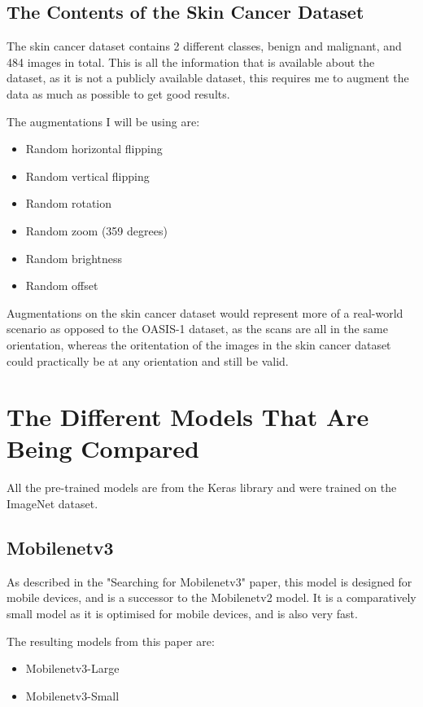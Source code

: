 \documentclass[]{final_report}
\begin{document}
\section{The Contents of the Skin Cancer Dataset}

The skin cancer dataset contains 2 different classes, benign and malignant, and 484 images in total.
This is all the information that is available about the dataset, as it is not a publicly available dataset, this requires me to augment the data as much as possible to get good results.

The augmentations I will be using are:
\begin{itemize}
  \item Random horizontal flipping
  \item Random vertical flipping
  \item Random rotation
  \item Random zoom (359 degrees)
  \item Random brightness
  \item Random offset
\end{itemize}

Augmentations on the skin cancer dataset would represent more of a real-world scenario as opposed to the OASIS-1 dataset, as the scans are all in the same orientation, whereas the oritentation of the images in the skin cancer dataset could practically be at any orientation and still be valid.

\chapter{The Different Models That Are Being Compared}

All the pre-trained models are from the Keras library\cite{Keras} and were trained on the ImageNet dataset\cite{ImageNet}.

\section{Mobilenetv3}

As described in the "Searching for Mobilenetv3" paper\cite{DBLP:journals/corr/abs-1905-02244}, this model is designed for mobile devices, and is a successor to the Mobilenetv2 model.
It is a comparatively small model as it is optimised for mobile devices, and is also very fast.

The resulting models from this paper are:
\begin{itemize}
  \item Mobilenetv3-Large
  \item Mobilenetv3-Small
\end{itemize}
\end{document}
